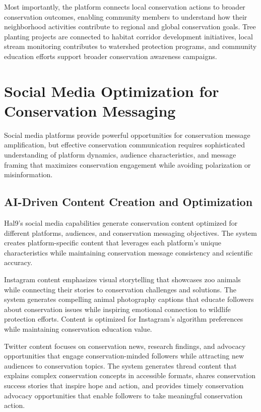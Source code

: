 \documentclass[
  Letterpaper,
]{scrbook}
\begin{document}
Most importantly, the platform connects local conservation actions to
broader conservation outcomes, enabling community members to understand
how their neighborhood activities contribute to regional and global
conservation goals. Tree planting projects are connected to habitat
corridor development initiatives, local stream monitoring contributes to
watershed protection programs, and community education efforts support
broader conservation awareness campaigns.

\section{Social Media Optimization for Conservation
Messaging}\label{social-media-optimization-for-conservation-messaging}

Social media platforms provide powerful opportunities for conservation
message amplification, but effective conservation communication requires
sophisticated understanding of platform dynamics, audience
characteristics, and message framing that maximizes conservation
engagement while avoiding polarization or misinformation.

\subsection{AI-Driven Content Creation and
Optimization}\label{ai-driven-content-creation-and-optimization}

Hal9's social media capabilities generate conservation content optimized
for different platforms, audiences, and conservation messaging
objectives. The system creates platform-specific content that leverages
each platform's unique characteristics while maintaining conservation
message consistency and scientific accuracy.

Instagram content emphasizes visual storytelling that showcases zoo
animals while connecting their stories to conservation challenges and
solutions. The system generates compelling animal photography captions
that educate followers about conservation issues while inspiring
emotional connection to wildlife protection efforts. Content is
optimized for Instagram's algorithm preferences while maintaining
conservation education value.

Twitter content focuses on conservation news, research findings, and
advocacy opportunities that engage conservation-minded followers while
attracting new audiences to conservation topics. The system generates
thread content that explains complex conservation concepts in accessible
formats, shares conservation success stories that inspire hope and
action, and provides timely conservation advocacy opportunities that
enable followers to take meaningful conservation action.
\end{document}
